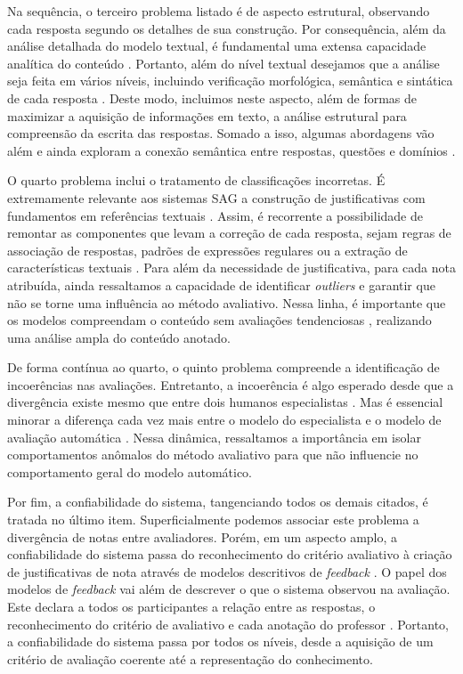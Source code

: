 Na sequência, o terceiro problema listado é de aspecto estrutural, observando cada resposta segundo os detalhes de sua construção. Por consequência, além da análise detalhada do modelo textual, é fundamental uma extensa capacidade analítica do conteúdo \cite{saha2018}. Portanto, além do nível textual desejamos que a análise seja feita em vários níveis, incluindo verificação morfológica, semântica e sintática de cada resposta \cite{sakaguchi2015, riordan2019, sahu2020}. Deste modo, incluimos neste aspecto, além de formas de maximizar a aquisição de informações em texto, a análise estrutural para compreensão da escrita das respostas. Somado a isso, algumas abordagens vão além e ainda exploram a conexão semântica entre respostas, questões e domínios \cite{dzikovska2013, saha2019}.

O quarto problema inclui o tratamento de classificações incorretas. É extremamente relevante aos sistemas SAG a construção de justificativas com fundamentos em referências textuais \cite{funayama2020}. Assim, é recorrente a possibilidade de remontar as componentes que levam a correção de cada resposta, sejam regras de associação de respostas, padrões de expressões regulares ou a extração de características textuais \cite{chakraborty2017, kumar2019}. Para além da necessidade de justificativa, para cada nota atribuída, ainda ressaltamos a capacidade de identificar \textit{outliers} \cite{ding2020} e garantir que não se torne uma influência ao método avaliativo. Nessa linha, é importante que os modelos compreendam o conteúdo sem avaliações tendenciosas \cite{azad2020}, realizando uma análise ampla do conteúdo anotado.

De forma contínua ao quarto, o quinto problema compreende a identificação de incoerências nas avaliações. Entretanto, a incoerência é algo esperado desde que a divergência existe mesmo que entre dois humanos especialistas \cite{artstein2008, pado2021}. Mas é essencial minorar a diferença cada vez mais entre o modelo do especialista e o modelo de avaliação automática \cite{condor2020}. Nessa dinâmica, ressaltamos a importância em isolar comportamentos anômalos do método avaliativo para que não influencie no comportamento geral do modelo automático.

Por fim, a confiabilidade do sistema, tangenciando todos os demais citados, é tratada no último item. Superficialmente podemos associar este problema a divergência de notas entre avaliadores. Porém, em um aspecto amplo, a confiabilidade do sistema passa do reconhecimento do critério avaliativo à criação de justificativas de nota através de modelos descritivos de \textit{feedback} \cite{kumar2019}. O papel dos modelos de \textit{feedback} vai além de descrever o que o sistema observou na avaliação. Este declara a todos os participantes a relação entre as respostas, o reconhecimento do critério de avaliativo e cada anotação do professor \cite{marvaniya2018}. Portanto, a confiabilidade do sistema passa por todos os níveis, desde a aquisição de um critério de avaliação coerente até a representação do conhecimento.

